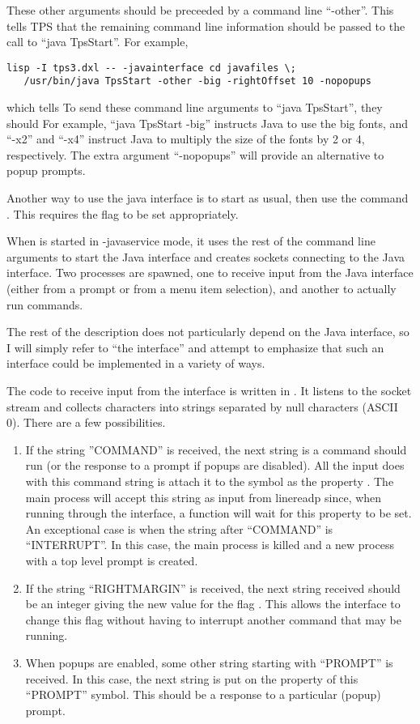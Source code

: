 These other arguments should be preceeded by a command line ``-other''.
This tells TPS that the remaining command line information should be passed
to the call to ``java TpsStart''.  For example,
\begin{verbatim}
lisp -I tps3.dxl -- -javainterface cd javafiles \;
   /usr/bin/java TpsStart -other -big -rightOffset 10 -nopopups
\end{verbatim}
which tells
To send these command line arguments to ``java TpsStart'', they should
For example, ``java TpsStart -big'' instructs Java to use the big fonts,
and ``-x2'' and ``-x4'' instruct Java to multiply the size of the fonts
by 2 or 4, respectively.  The extra argument ``-nopopups'' will
provide an alternative to popup prompts.

Another way to use the java interface is to start \TPS as usual,
then use the command .  This requires the
flag  to be set appropriately.

When \TPS is started in -javaservice mode, it uses the rest of the
command line arguments to start the Java interface and creates
sockets connecting \TPS to the Java interface.  Two processes
are spawned, one to receive input from the Java interface
(either from a prompt or from a menu item selection), and
another to actually run \TPS commands.

The rest of the description does not particularly depend on
the Java interface, so I will simply refer to ``the interface''
and attempt to emphasize that such an interface could be
implemented in a variety of ways.

The code to receive input from the interface is written
in .  It listens to the
socket stream and collects characters into strings
separated by null characters (ASCII 0).  
There are a few possibilities.
\begin{enumerate}
\item If the string ''COMMAND'' is received,
the next string is a command \TPS should run
(or the response to a prompt if popups are disabled).
All the input does with this command string is 
attach it to the  symbol
as the property .
The main process will accept this string as input
from linereadp since, when running through the interface,
a function  will wait
for this  property to be set.
An exceptional case is when the string after
``COMMAND'' is ``INTERRUPT''.  In this case,
the main process is killed and a new process
with a top level prompt is created.
\item If the string ``RIGHTMARGIN'' is received,
the next string received should be an integer giving
the new value for the flag .
This allows the interface to change this flag
without having to interrupt another command that
may be running.
\item When popups are enabled, some other string starting with ``PROMPT''
is received.  In this case, the next string is
put on the  property
of this ``PROMPT'' symbol.  This should be
a response to a particular (popup) prompt.
\end{enumerate}

